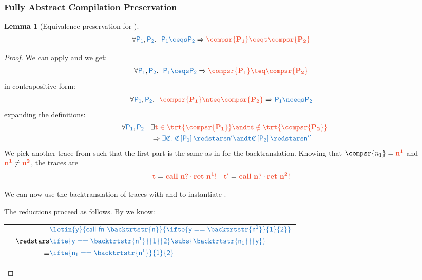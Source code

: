 \documentclass{article}
\newtheorem{lemma}[theorem]{Lemma}
\theoremstyle{definition}
\begin{document}
\subsubsection{Fully Abstract Compilation Preservation}
\begin{lemma}[Equivalence preservation for \compsr{\cdot}]\label{thm:pres-compgen-r}
	\begin{align*}
	\forall \src{P_1}, \src{P_2}.~
		&\
		\src{P_1\ceqs P_2} \Rightarrow \trg{\compsr{P_1}\ceqt \compsr{P_2}}
	\end{align*}
\end{lemma}
\begin{proof}
We can apply  and we get:
\begin{align*}
	\forall \src{P_1}, \src{P_2}.~
		&\
		\src{P_1\ceqs P_2} \Rightarrow \trg{\compsr{P_1}\teq \compsr{P_2}}
\end{align*}
in contrapositive form:
\begin{align*}
	\forall \src{P_1}, \src{P_2}.~
		&\
		  \trg{\compsr{P_1}\nteq \compsr{P_2}}\Rightarrow\src{P_1\nceqs P_2}
\end{align*}
expanding the definitions:
\begin{align*}
	\forall \src{P_1}, \src{P_2}.~
		&\
		  \exists\trg{t \in\trt{\compsr{P_1}} \andt t\notin{}}
	\\
	&\
	\Rightarrow\src{\exists \ctx.~ \ctx\hole{P_1}\redstars n' \andt \ctx\hole{P_2}\redstars n''}
\end{align*}
We pick another trace \trg{t'} from \trt{\compsr{P_2}} such that the first part is the same as in  for the backtranslation.
Knowing that $\compsr{n_1}=\trg{n^1}$ and $\trg{n^1}\neq\trg{n^2}$, the traces are
\begin{align*}
	 =&\ \trg{call~n? \cdot ret~n^1!}
	&
	 =&\ \trg{call~n? \cdot ret~n^2!}
\end{align*}

We can now use the backtranslation of traces with \trg{t} and \trg{t'} to instantiate \src{\ctx}.

The reductions proceed as follows.
By  we know:

\begin{tabular}{c|c}
	\compsr{P_1}
	&
	{$\begin{aligned}
		&
	\src{
		\letin{y}{call~fn~\backtrtstr{n}}{ \ifte{y == \backtrtstr{n^1}}{1}{2} }
		}
	\\
	\redstars
	&
	\src{
		\ifte{y == \backtrtstr{n^1}}{1}{2}\subs{\backtrtstr{n_1}}{y}
		)}
	\\
	\equiv
	&
	\src{
		\ifte{n_1 == \backtrtstr{n^1}}{1}{2}
		}
	\end{aligned}$}
	\end{tabular}


\end{proof}
\end{document}
